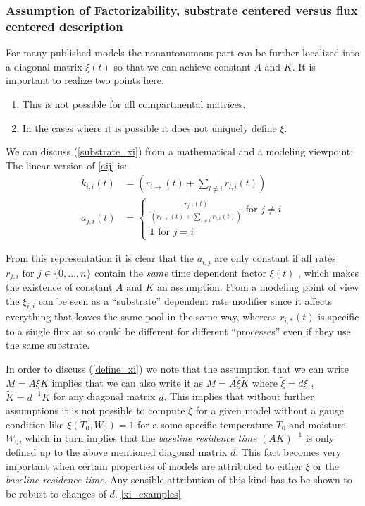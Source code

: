 \documentclass[journal abbreviation, manuscript]{copernicus}
\theoremstyle{definition}
\begin{document}
\subsubsection{Assumption of Factorizability, substrate centered versus flux centered description}
For many published models the nonautonomous part  can be further localized into a diagonal matrix $\xi(t)$ so that we can achieve constant $A$ and $K$. It is important to realize two points here:
\begin{enumerate}
\item \label{substrate_xi}
  This is not possible for all compartmental matrices.
\item  \label{define_xi}
  In the cases where it is possible it does not uniquely define $\xi$.
\end{enumerate}

We can discuss (\ref{substrate_xi}) from a mathematical and a modeling viewpoint:
\newcommand{\kiit}{
      \left(
      r_{i \rightarrow } (t)
      + 
      \sum_{l \ne i} r_{l,i} (t)
      \right)
}
The linear version of \eqref{aij} is: 
\begin{align}
  k_{i,i}(t) &=\kiit \nonumber
  \\
  a_{j,i}(t) &=\left\{
  \begin{matrix}
  \frac{
    r_{j,i} (t)
  }{
    \kiit
  } \text{ for } j \ne i
  \\
  1 \text{ for } j=i
  \end{matrix}
  \right.
  \label{aij}
\end{align}

From this representation it is clear that the $a_{i,j}$ are only constant if all rates $r_{j,i} \text{ for } j \in \{0,\dots ,n \}$ contain the \emph{same} time dependent factor $\xi(t)$ , which makes the existence of constant $A$ and $K$ 
an assumption.
From a modeling point of view the $\xi_{i,i}$ can be seen as a ``substrate'' dependent rate modifier since it affects everything that leaves the same pool in the same way, whereas $r_{i,*}(t)$ is specific to a single flux an so could be different for different ``processes'' even if they use the same substrate.


In order to discuss (\ref{define_xi}) we note that the assumption that we can write 
$M=A \xi K$ implies that we can also write it as $M=A \tilde{\xi} \tilde{K}$
where $\tilde{\xi}=d\xi$ , $\tilde{K}=d^{-1} K$ for any diagonal matrix $d$.
This implies that without further assumptions it is not possible to compute $\xi$
for a given model without a gauge condition like $\xi(T_0, W_0)=1$ for a some
specific temperature $T_0$ and moisture $W_0$, which in turn implies that the {\it baseline residence time } $(A K)^{-1}$
is only defined up to the above mentioned diagonal matrix $d$.
This fact becomes very important when certain properties of models are attributed to either $\xi$ or the {\it baseline residence time}.
Any sensible attribution of this kind has to be shown to be robust to changes of $d$.
\ref{xi_examples}
\end{document}
